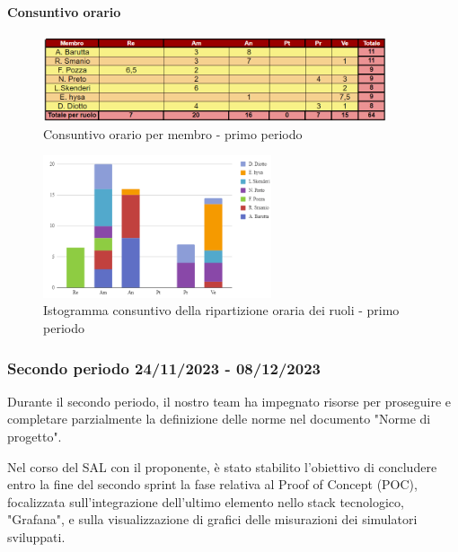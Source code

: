 \paragraph{Consuntivo orario} \hspace{1pt}

\begin{figure}[H]
    \centering
    \includegraphics[width=0.9\textwidth]{../Images/consuntivoOrario1Periodo.png}
    \caption{Consuntivo orario per membro - primo periodo}
    \label{fig:Constuntivo_orario_1}
\end{figure}

\begin{figure}[H]
    \centering
    \includegraphics[width=0.6\textwidth]{../Images/consuntivoDivisioneRuoli1Periodo.png}
    \caption{Istogramma consuntivo della ripartizione oraria dei ruoli - primo periodo}
    \label{fig:Consuntivo_ripartizione_oraria_1}
\end{figure}


\subsubsection{Secondo periodo  24/11/2023 - 08/12/2023}
Durante il secondo periodo, il nostro team ha impegnato risorse per proseguire e completare parzialmente la definizione delle norme nel documento "Norme di progetto".

Nel corso del SAL con il proponente, è stato stabilito l'obiettivo di concludere entro la fine del secondo sprint la fase relativa al Proof of Concept (POC), focalizzata sull'integrazione dell'ultimo elemento nello stack tecnologico, "Grafana", e sulla visualizzazione di grafici delle misurazioni dei simulatori sviluppati.

